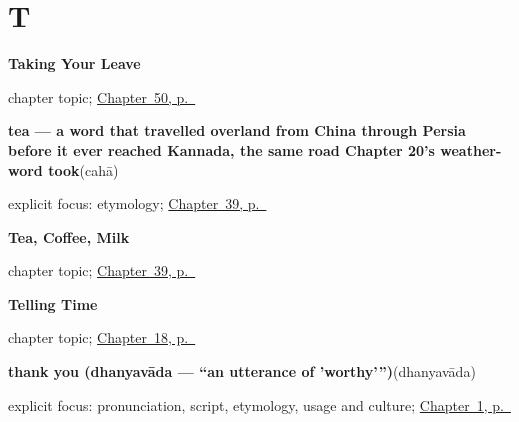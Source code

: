 \section*{T}

\noindent\begin{minipage}[t]{\linewidth}
\raggedright
\textbf{Taking Your Leave}\par
\footnotesize chapter topic; \hyperref[ch:ka-leave-more]{Chapter~50, p.~\pageref*{ch:ka-leave-more}}
\end{minipage}\par\smallskip

\noindent\begin{minipage}[t]{\linewidth}
\raggedright
\textbf{tea — a word that travelled overland from China through Persia before it ever reached Kannada, the same road Chapter 20's weather-word took}\enspace\emph{}\enspace(cahā)\par
\footnotesize explicit focus: etymology; \hyperref[ch:ka-tea-coffee-milk]{Chapter~39, p.~\pageref*{ch:ka-tea-coffee-milk}}
\end{minipage}\par\smallskip

\noindent\begin{minipage}[t]{\linewidth}
\raggedright
\textbf{Tea, Coffee, Milk}\par
\footnotesize chapter topic; \hyperref[ch:ka-tea-coffee-milk]{Chapter~39, p.~\pageref*{ch:ka-tea-coffee-milk}}
\end{minipage}\par\smallskip

\noindent\begin{minipage}[t]{\linewidth}
\raggedright
\textbf{Telling Time}\par
\footnotesize chapter topic; \hyperref[ch:ka-telling-time]{Chapter~18, p.~\pageref*{ch:ka-telling-time}}
\end{minipage}\par\smallskip

\noindent\begin{minipage}[t]{\linewidth}
\raggedright
\textbf{thank you (dhanyavāda — \textquotedblleft{}an utterance of 'worthy'\textquotedblright{})}\enspace\emph{}\enspace(dhanyavāda)\par
\footnotesize explicit focus: pronunciation, script, etymology, usage and culture; \hyperref[ch:greetings]{Chapter~1, p.~\pageref*{ch:greetings}}
\end{minipage}\par\smallskip

